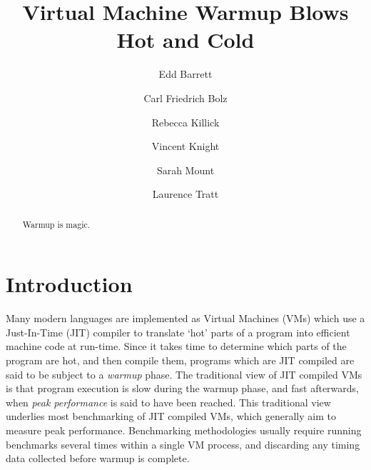 \documentclass[a4paper,UKenglish]{lipics}
\begin{document}
\title{Virtual Machine Warmup Blows Hot and Cold}
\author[1]{Edd Barrett}
\author[2]{Carl Friedrich Bolz}
\author[3]{Rebecca Killick}
\author[4]{Vincent Knight}
\author[5]{Sarah Mount}
\author[6]{Laurence Tratt}


\maketitle

\begin{abstract}
Warmup is magic.
\end{abstract}

\section{Introduction}
\label{sec:intro}

Many modern languages are implemented as Virtual Machines (VMs) which use a
Just-In-Time (JIT) compiler to translate `hot' parts of a program into efficient
machine code at run-time. Since it takes time to determine which parts of the
program are hot, and then compile them, programs which are JIT compiled are
said to be subject to a \emph{warmup} phase. The traditional view of
JIT compiled VMs is that program execution is slow during the warmup phase, and
fast afterwards, when \emph{peak performance} is said to have been reached.
This traditional view underlies most benchmarking of JIT compiled VMs, which
generally aim to measure peak performance. Benchmarking methodologies usually
require running benchmarks several times within a single VM process, and
discarding any timing data collected before warmup is complete.
\end{document}
